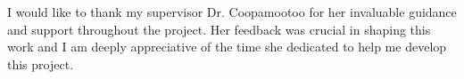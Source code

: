 I would like to thank my supervisor Dr. Coopamootoo for her invaluable guidance and support throughout the project. Her feedback was crucial in shaping this work and I am deeply appreciative of the time she dedicated to help me develop this project.


